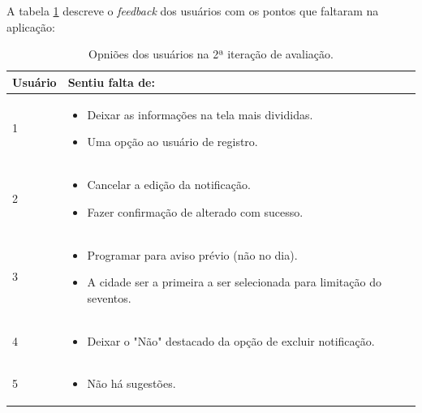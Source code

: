   A tabela \ref{opnioes2iteracao} descreve o \textit{feedback} dos usuários com os pontos que faltaram na aplicação:
	
  \begin{table}[h]
  \centering
  \begin{tabular}{|m{1.5cm}||m{15cm}|}
    \hline
    \textbf{Usuário} & \textbf{Sentiu falta de:}\\
    
    \hline                               
    1 & 
      \begin{itemize}
	\item Deixar as informações na tela mais divididas.
	\item Uma opção ao usuário de registro.
      \end{itemize}\\

    \hline                               
    2 & 
      \begin{itemize}
	\item Cancelar a edição da notificação.
	\item Fazer confirmação de alterado com sucesso.
      \end{itemize}\\
    
    \hline                               
    3 & 
      \begin{itemize}
	\item Programar para aviso prévio (não no dia).
	\item A cidade ser a primeira a ser selecionada para limitação do seventos.
      \end{itemize}\\
    
    \hline                               
    4 & 
    \begin{itemize}
      \item Deixar o "Não" destacado da opção de excluir notificação.
    \end{itemize}\\
    
    \hline                               
    5 & 
    \begin{itemize}
      \item Não há sugestões.
    \end{itemize}\\
    
    \hline
  \end{tabular}
  \caption{Opniões dos usuários na 2ª iteração de avaliação.}
  \label{opnioes2iteracao}
  \end{table}
  
